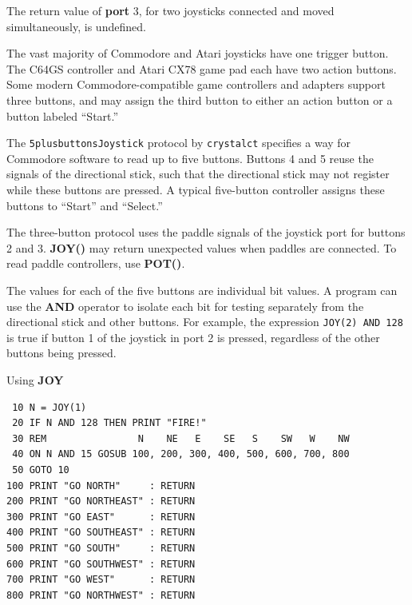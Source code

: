 \begin{description}[leftmargin=2cm,style=nextline]
\item [Remarks:]  The return value of {\bf port} 3, for two joysticks connected and moved simultaneously, is undefined.

                  The vast majority of Commodore and Atari joysticks have one trigger button. The C64GS controller and Atari CX78 game pad each have two action buttons. Some modern Commodore-compatible game controllers and adapters support three buttons, and may assign the third button to either an action button or a button labeled ``Start.''

                  The \texttt{5plusbuttonsJoystick} protocol by \texttt{crystalct} specifies a way for Commodore software to read up to five buttons. Buttons 4 and 5 reuse the signals of the directional stick, such that the directional stick may not register while these buttons are pressed. A typical five-button controller assigns these buttons to ``Start'' and ``Select.''

                  The three-button protocol uses the paddle signals of the joystick port for buttons 2 and 3. {\bf JOY()} may return unexpected values when paddles are connected. To read paddle controllers, use {\bf POT()}.

                  The values for each of the five buttons are individual bit values. A program can use the {\bf AND} operator to isolate each bit for testing separately from the directional stick and other buttons. For example, the expression \texttt{JOY(2) AND 128} is true if button 1 of the joystick in port 2 is pressed, regardless of the other buttons being pressed.

\item [Example:]  Using {\bf JOY}

\begin{tcolorbox}[colback=black,coltext=white]
\verbatimfont{\codefont}
\begin{verbatim}
 10 N = JOY(1)
 20 IF N AND 128 THEN PRINT "FIRE!"
 30 REM                N    NE   E    SE   S    SW   W    NW
 40 ON N AND 15 GOSUB 100, 200, 300, 400, 500, 600, 700, 800
 50 GOTO 10
100 PRINT "GO NORTH"     : RETURN
200 PRINT "GO NORTHEAST" : RETURN
300 PRINT "GO EAST"      : RETURN
400 PRINT "GO SOUTHEAST" : RETURN
500 PRINT "GO SOUTH"     : RETURN
600 PRINT "GO SOUTHWEST" : RETURN
700 PRINT "GO WEST"      : RETURN
800 PRINT "GO NORTHWEST" : RETURN
\end{verbatim}
\end{tcolorbox}
\end{description}

